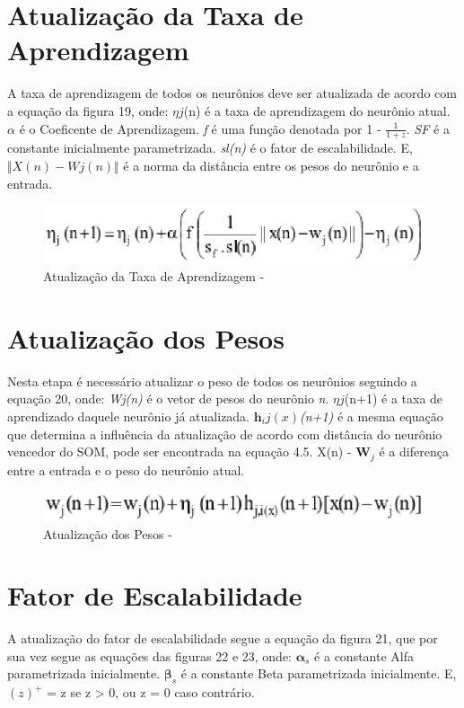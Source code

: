 \section{Atualização da Taxa de Aprendizagem}
A taxa de aprendizagem de todos os neurônios deve ser atualizada de acordo com a equação da figura 19, onde: $\eta j$(n) é a taxa de aprendizagem do neurônio atual. \textit{$\alpha$} é o Coeficente de Aprendizagem. \textit{f} é uma função denotada por 1 - $\frac{1}{1 + z}$. \textit{SF} é a constante inicialmente parametrizada. \textit{sl(n)} é o fator de escalabilidade. E, $\Vert X(n) - Wj(n)\Vert$ é a norma da distância entre os pesos do neurônio e a entrada. 

\begin{figure}[!h]
\centering
\includegraphics[keepaspectratio=true,scale=0.65]
{figuras/learn.eps}
\caption{Atualização da Taxa de Aprendizagem - }
\label{data_titatic}
\end{figure}

\section{Atualização dos Pesos}
Nesta etapa é necessário atualizar o peso de todos os neurônios seguindo a equação 20, onde: \textit{Wj(n)} é o vetor de pesos do neurônio \textit{n}. $\eta j$(n+1) é a taxa de aprendizado daquele neurônio já atualizada. \textit{$\mathbf{h}_ij(x)$(n+1)} é a mesma equação que determina a influência da atualização de acordo com distância do neurônio vencedor do SOM, pode ser encontrada na equação 4.5. X(n) - $\mathbf{W}_j$ é a diferença entre a entrada e o peso do neurônio atual.

\begin{figure}[!h]
\centering
\includegraphics[keepaspectratio=true,scale=0.65]
{figuras/synp.eps}
\caption{Atualização dos Pesos - }
\label{data_titatic}
\end{figure}


\section{Fator de Escalabilidade}
A atualização do fator de escalabilidade segue a equação da figura 21, que por sua vez segue as equações das figuras 22 e 23, onde: $\mathbf \alpha _s$ é a constante Alfa parametrizada inicialmente. $\mathbf \beta _s$ é a constante Beta parametrizada inicialmente. E, $(z)^+$ = z se z > 0, ou z = 0 caso contrário.

